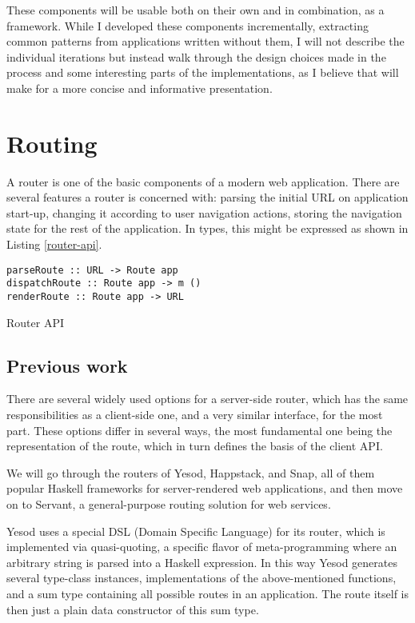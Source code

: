 \documentclass[english,odsaz]{fitthesis}
\begin{document}
These components will be usable both on their own and in combination, as a
framework. While I developed these components incrementally, extracting common
patterns from applications written without them, I will not describe the
individual iterations but instead walk through the design choices made in the
process and some interesting parts of the implementations, as I believe that
will make for a more concise and informative presentation.

\section{Routing}
\label{sec:org8c28894}
A router is one of the basic components of a modern web application. There are
several features a router is concerned with: parsing the initial URL on
application start-up, changing it according to user navigation actions, storing
the navigation state for the rest of the application. In types, this might be
expressed as shown in Listing \ref{router-api}.

\begin{listing}[htbp]
\begin{verbatim}
parseRoute :: URL -> Route app
dispatchRoute :: Route app -> m ()
renderRoute :: Route app -> URL
\end{verbatim}
\caption{Router API \label{router-api}}
\end{listing}

\subsection{Previous work}
\label{sec:org442d4dc}
There are several widely used options for a server-side router, which has the
same responsibilities as a client-side one, and a very similar interface, for
the most part. These options differ in several ways, the most fundamental one
being the representation of the route, which in turn defines the basis of the
client API.

We will go through the routers of Yesod, Happstack, and Snap, all of them
popular Haskell frameworks for server-rendered web applications, and then move
on to Servant, a general-purpose routing solution for web services.

Yesod uses a special DSL (Domain Specific Language) for its router, which is
implemented via quasi-quoting, a specific flavor of meta-programming where an
arbitrary string is parsed into a Haskell expression. In this way Yesod
generates several type-class instances, implementations of the above-mentioned
functions, and a sum type containing all possible routes in an application. The
route itself is then just a plain data constructor of this sum type.
\end{document}
